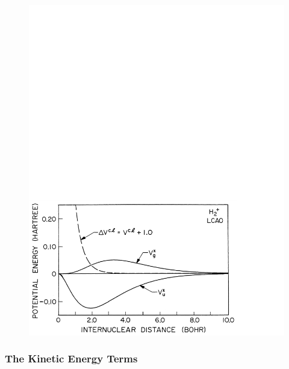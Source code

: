 \begin{figure}
\includegraphics[scale=0.75]{fig2-36}
\caption{}
\label{fig2app-3}
\end{figure}

\subsubsection{The Kinetic Energy Terms}

